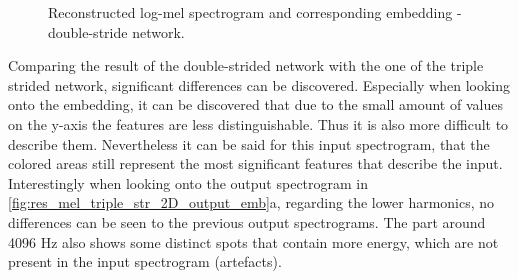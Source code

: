 \begin{figure}[htb!]
    \centering
    \captionsetup{justification=centering}
    \caption{Reconstructed log-mel spectrogram and corresponding embedding - double-stride network.}
    \label{fig:res_mel_double_str_2D_output_emb}
\end{figure}

Comparing the result of the double-strided network with the one of the triple strided network, significant differences can be discovered. Especially when looking onto the embedding, it can be discovered that due to the small amount of values on the y-axis the features are less distinguishable. Thus it is also more difficult to describe them. Nevertheless it can be said for this input spectrogram, that the colored areas still represent the most significant features that describe the input. Interestingly when looking onto the output spectrogram in \ref{fig:res_mel_triple_str_2D_output_emb}a, regarding the lower harmonics, no differences can be seen to the previous output spectrograms. The part around 4096 Hz also shows some distinct spots that contain more energy, which are not present in the input spectrogram (artefacts).

